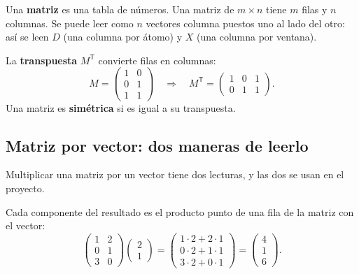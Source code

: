 \documentclass[11pt,letterpaper]{article}
\newcommand{\T}{^{\mathsf{T}}}
\begin{document}
Una \textbf{matriz} es una tabla de números. Una matriz de
$m \times n$ tiene $m$ filas y $n$ columnas. Se puede leer como $n$
vectores columna puestos uno al lado del otro: así se leen $D$ (una
columna por átomo) y $X$ (una columna por ventana).

La \textbf{transpuesta} $M\T$ convierte filas en columnas:
\[
    M = \begin{pmatrix} 1 & 0 \\ 0 & 1 \\ 1 & 1 \end{pmatrix}
    \quad\Longrightarrow\quad
    M\T = \begin{pmatrix} 1 & 0 & 1 \\ 0 & 1 & 1 \end{pmatrix} .
\]
Una matriz es \textbf{simétrica} si es igual a su transpuesta.

\subsection*{Matriz por vector: dos maneras de leerlo}

Multiplicar una matriz por un vector tiene dos lecturas, y las dos se
usan en el proyecto.

\begin{ejemplo}
    Cada componente del resultado es el producto punto de una fila de
    la matriz con el vector:
    \[
        \begin{pmatrix} 1 & 2 \\ 0 & 1 \\ 3 & 0 \end{pmatrix}
        \begin{pmatrix} 2 \\ 1 \end{pmatrix}
        =
        \begin{pmatrix}
            1 \cdot 2 + 2 \cdot 1 \\
            0 \cdot 2 + 1 \cdot 1 \\
            3 \cdot 2 + 0 \cdot 1
        \end{pmatrix}
        =
        \begin{pmatrix} 4 \\ 1 \\ 6 \end{pmatrix} .
    \]
\end{ejemplo}
\end{document}
